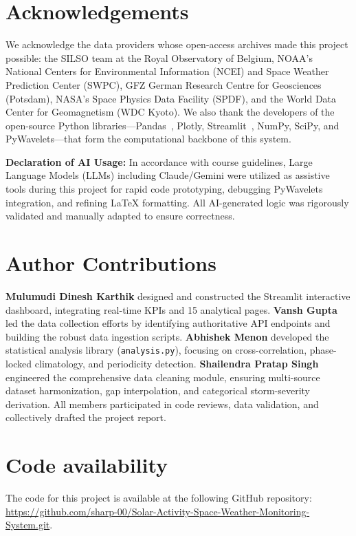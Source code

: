\section{Acknowledgements}

We acknowledge the data providers whose open-access archives made this project possible: the SILSO team at the Royal Observatory of Belgium, NOAA's National Centers for Environmental Information (NCEI) and Space Weather Prediction Center (SWPC), GFZ German Research Centre for Geosciences (Potsdam), NASA's Space Physics Data Facility (SPDF), and the World Data Center for Geomagnetism (WDC Kyoto). We also thank the developers of the open-source Python libraries---Pandas~\citep{mckinney_pandas_2010}, Plotly, Streamlit~\citep{streamlit_2020}, NumPy, SciPy, and PyWavelets---that form the computational backbone of this system.

\textbf{Declaration of AI Usage:} In accordance with course guidelines, Large Language Models (LLMs) including Claude/Gemini were utilized as assistive tools during this project for rapid code prototyping, debugging PyWavelets integration, and refining LaTeX formatting. All AI-generated logic was rigorously validated and manually adapted to ensure correctness.


\section{Author Contributions}

\textbf{Mulumudi Dinesh Karthik} designed and constructed the Streamlit interactive dashboard, integrating real-time KPIs and 15 analytical pages. \textbf{Vansh Gupta} led the data collection efforts by identifying authoritative API endpoints and building the robust data ingestion scripts. \textbf{Abhishek Menon} developed the statistical analysis library (\texttt{analysis.py}), focusing on cross-correlation, phase-locked climatology, and periodicity detection. \textbf{Shailendra Pratap Singh} engineered the comprehensive data cleaning module, ensuring multi-source dataset harmonization, gap interpolation, and categorical storm-severity derivation. All members participated in code reviews, data validation, and collectively drafted the project report.


\section{Code availability}
The code for this project is available at the following GitHub repository:
\url{https://github.com/sharp-00/Solar-Activity-Space-Weather-Monitoring-System.git}.

